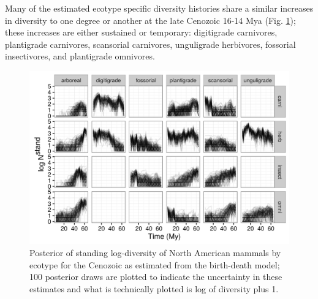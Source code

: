 \documentclass[12pt,letterpaper]{article}
\begin{document}
Many of the estimated ecotype specific diversity histories share a similar increases in diversity to one degree or another at the late Cenozoic 16-14 Mya (Fig. \ref{fig:ecotype_diversity}); these increases are either sustained or temporary: digitigrade carnivores, plantigrade carnivores, scansorial carnivores, unguligrade herbivores, fossorial insectivores, and plantigrade omnivores.

\begin{figure}[ht]
  \centering
  \includegraphics[width=\textwidth,height=0.5\textheight,keepaspectratio=true]{figure/ecotype_diversity}
  \caption[Estimated mammal ecotype log-diversity for the Cenozoic]{Posterior of standing log-diversity of North American mammals by ecotype for the Cenozoic as estimated from the birth-death model; 100 posterior draws are plotted to indicate the uncertainty in these estimates and what is technically plotted is log of diversity plus 1.}
  \label{fig:ecotype_diversity}
\end{figure}
\end{document}
